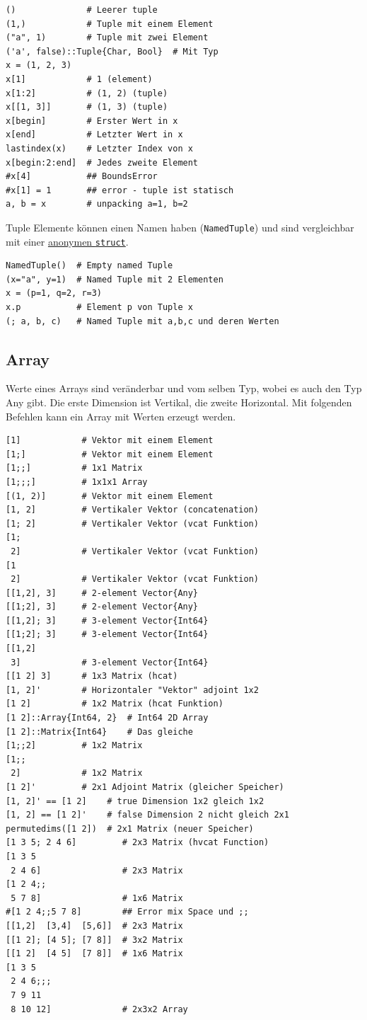 \documentclass[10pt,twocolumn]{scrartcl}
\begin{document}
\begin{lstlisting}
()              # Leerer tuple
(1,)            # Tuple mit einem Element
("a", 1)        # Tuple mit zwei Element
('a', false)::Tuple{Char, Bool}  # Mit Typ
x = (1, 2, 3)
x[1]            # 1 (element)
x[1:2]          # (1, 2) (tuple)
x[[1, 3]]       # (1, 3) (tuple)
x[begin]        # Erster Wert in x
x[end]          # Letzter Wert in x
lastindex(x)    # Letzter Index von x
x[begin:2:end]  # Jedes zweite Element
#x[4]           ## BoundsError
#x[1] = 1       ## error - tuple ist statisch
a, b = x        # unpacking a=1, b=2
\end{lstlisting}

Tuple Elemente können einen Namen haben (\lstinline|NamedTuple|) und sind
vergleichbar mit einer \hyperref[ssec:composite]{anonymen \lstinline|struct|}.

\begin{lstlisting}
NamedTuple()  # Empty named Tuple
(x="a", y=1)  # Named Tuple mit 2 Elementen
x = (p=1, q=2, r=3)
x.p           # Element p von Tuple x
(; a, b, c)   # Named Tuple mit a,b,c und deren Werten
\end{lstlisting}

\subsection{Array}
\label{ssec:array}

Werte eines Arrays sind veränderbar und vom selben Typ, wobei es auch den Typ
Any gibt. Die erste Dimension ist Vertikal, die zweite Horizontal. Mit folgenden
Befehlen kann ein Array mit Werten erzeugt werden.

\begin{lstlisting}
[1]            # Vektor mit einem Element
[1;]           # Vektor mit einem Element
[1;;]          # 1x1 Matrix
[1;;;]         # 1x1x1 Array
[(1, 2)]       # Vektor mit einem Element
[1, 2]         # Vertikaler Vektor (concatenation)
[1; 2]         # Vertikaler Vektor (vcat Funktion)
[1;
 2]            # Vertikaler Vektor (vcat Funktion)
[1
 2]            # Vertikaler Vektor (vcat Funktion)
[[1,2], 3]     # 2-element Vector{Any}
[[1;2], 3]     # 2-element Vector{Any}
[[1,2]; 3]     # 3-element Vector{Int64}
[[1;2]; 3]     # 3-element Vector{Int64}
[[1,2]
 3]            # 3-element Vector{Int64}
[[1 2] 3]      # 1x3 Matrix (hcat)
[1, 2]'        # Horizontaler "Vektor" adjoint 1x2
[1 2]          # 1x2 Matrix (hcat Funktion)
[1 2]::Array{Int64, 2}  # Int64 2D Array
[1 2]::Matrix{Int64}    # Das gleiche
[1;;2]         # 1x2 Matrix
[1;;
 2]            # 1x2 Matrix
[1 2]'         # 2x1 Adjoint Matrix (gleicher Speicher)
[1, 2]' == [1 2]    # true Dimension 1x2 gleich 1x2
[1, 2] == [1 2]'    # false Dimension 2 nicht gleich 2x1
permutedims([1 2])  # 2x1 Matrix (neuer Speicher)
[1 3 5; 2 4 6]         # 2x3 Matrix (hvcat Function)
[1 3 5
 2 4 6]                # 2x3 Matrix
[1 2 4;;
 5 7 8]                # 1x6 Matrix
#[1 2 4;;5 7 8]        ## Error mix Space und ;;
[[1,2]  [3,4]  [5,6]]  # 2x3 Matrix
[[1 2]; [4 5]; [7 8]]  # 3x2 Matrix
[[1 2]  [4 5]  [7 8]]  # 1x6 Matrix
[1 3 5
 2 4 6;;;
 7 9 11
 8 10 12]              # 2x3x2 Array
\end{lstlisting}
\end{document}
